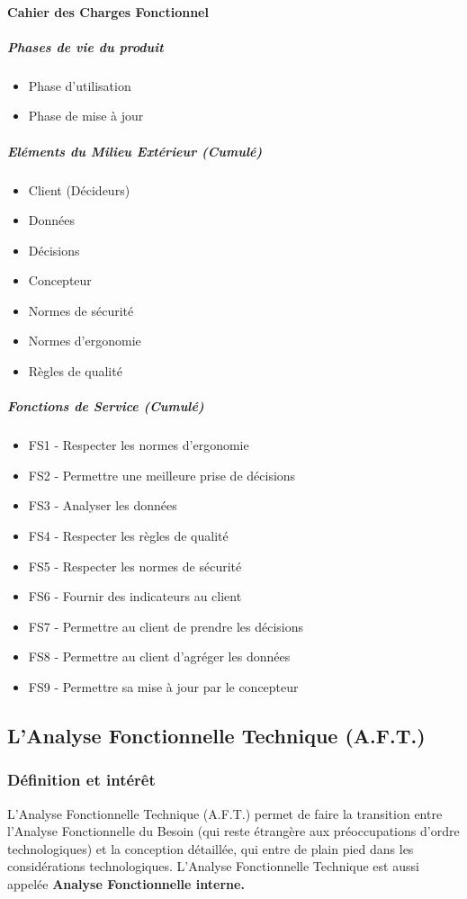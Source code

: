 \paragraph{Cahier des Charges Fonctionnel}
\subparagraph{Phases de vie du produit}
\begin{itemize}
    \item Phase d'utilisation
    \item Phase de mise à jour
\end{itemize}
\subparagraph{Eléments du Milieu Extérieur (Cumulé)}
\begin{itemize}
    \item Client (Décideurs) 
    \item Données 
    \item Décisions 
    \item Concepteur
    \item Normes de sécurité 
    \item Normes d'ergonomie
    \item Règles de qualité
\end{itemize}
\subparagraph{Fonctions de Service (Cumulé)}
\begin{itemize}
    \item FS1 - Respecter les normes d’ergonomie
    \item FS2 - Permettre une meilleure prise de décisions
    \item FS3 - Analyser les données
    \item FS4 - Respecter les règles de qualité 
    \item FS5 - Respecter les normes de sécurité
    \item FS6 - Fournir des indicateurs au client
    \item FS7 - Permettre au client de prendre les décisions
    \item FS8 - Permettre au client d'agréger les données
    \item FS9 - Permettre sa mise à jour par le concepteur
\end{itemize}



\subsection{L'Analyse Fonctionnelle Technique (A.F.T.)}

\subsubsection{Définition et intérêt}
L’Analyse Fonctionnelle Technique (A.F.T.) permet de faire la transition entre l’Analyse Fonctionnelle du Besoin (qui reste étrangère aux préoccupations d’ordre technologiques) et la conception détaillée, qui entre de plain pied dans les considérations technologiques. L’Analyse Fonctionnelle Technique est aussi appelée \textbf{Analyse Fonctionnelle interne.}

